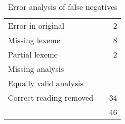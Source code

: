 \documentclass[11pt]{article}
\begin{document}
\begin{table}
  \centering
  \begin{tabular}{|l|r|r|}
    
    \hline
    Error in original        &   & 2 \\
    Missing lexeme           &   & 8  \\          %
    Partial lexeme           &   & 2  \\          %
    Missing analysis         &   &    \\        %
    Equally valid analysis   &   &    \\   %
    Correct reading removed  &   & 34   \\ %
    \hline
                             &   & 46 \\
    \hline
  \end{tabular}
  \caption{Error analysis of false negatives}
\end{table}








\end{document}
